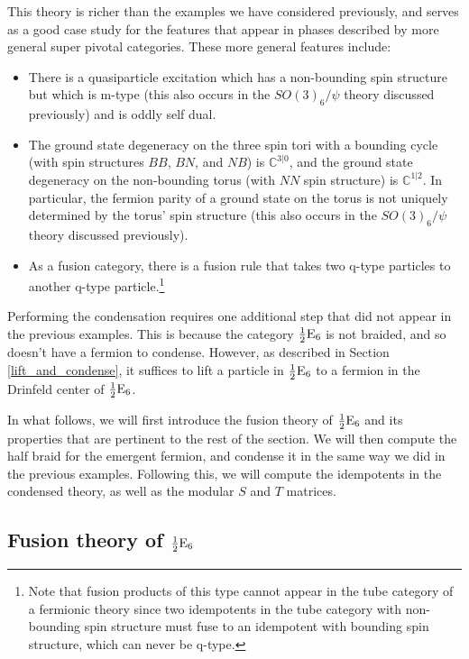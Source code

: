 This theory is richer than the examples we have considered previously, and serves as a good 
case study for the features that appear in phases described by more general super pivotal 
categories. 
These more general features include:
\begin{itemize}
\item There is a quasiparticle excitation which has a non-bounding spin structure but which is m-type 
(this also occurs in the $SO(3)_6/\psi$ theory discussed previously) and is oddly self dual.
\item The ground state degeneracy on the three spin tori with a bounding cycle (with spin 
structures $BB$, $BN$, and $NB$) is $\mathbb{C}^{3|0}$, and the ground state degeneracy on the 
non-bounding torus (with $NN$ spin structure) is $\mathbb{C}^{1|2}$.
In particular, the fermion parity of a ground state on the torus is not uniquely determined by 
the torus' spin structure (this also occurs in the $SO(3)_6/\psi$ theory discussed previously). 
\item As a fusion category, there is a fusion rule that takes two q-type particles to another q-type particle.\footnote{
Note that fusion products of this type cannot appear in the tube category of a fermionic theory since two idempotents 
in the tube category with non-bounding spin structure must fuse to an idempotent with bounding spin structure, which can never be q-type.
}
\end{itemize}

Performing the condensation requires one additional step that did not appear in the previous examples. 
This is because the category $\frac{1}{2}\text{E}_6$ is not braided, and so doesn't have a fermion to condense.
However, as described in Section \ref{lift_and_condense}, 
it suffices to lift a particle in $\frac{1}{2}\text{E}_6$ to a fermion in the Drinfeld center of $\frac{1}{2}\text{E}_6$.

In what follows, we will first introduce the fusion theory of $\frac{1}{2}\text{E}_6$ 
and its properties that are pertinent to the rest of the section.
We will then compute the half braid for the emergent fermion, and condense it in the same way we did in the previous examples.
Following this, we will compute the idempotents in the condensed theory, 
as well as the modular $S$ and $T$ matrices. 



\subsection{Fusion theory of $\frac{1}{2}\text{E}_6$}
\label{halfesixFusionTheory}

